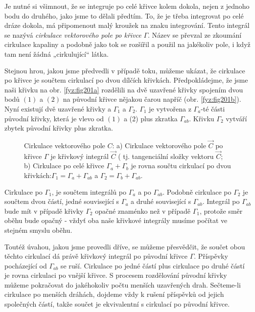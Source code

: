     Je nutné si všimnout, že se integruje po celé křivce kolem dokola, nejen z jednoho bodu do 
    druhého, jako jsme to dělali předtím. To, že je třeba integrovat po celé dráze dokola, má 
    připomenout malý kroužek na znaku integrování. Tento integrál se nazývá \emph{cirkulace 
    vektorového pole po křivce} \(\Gamma\). Název se převzal ze zkoumání cirkulace kapaliny a 
    podobně jako tok se rozšířil a použil na jakékoliv pole, i když tam není žádná „cirkulující“ 
    látka.
    
    Stejnou hrou, jakou jsme předvedli v případě toku, můžeme ukázat, že cirkulace po křivce je 
    součtem cirkulací po dvou dílčích křivkách. Předpokládejme, že jsme naši křivku na obr. 
    \ref{fyz:fig201a} rozdělili na dvě uzavřené křivky spojením dvou bodů \((1)\) a \((2)\) na 
    původní křivce nějakou čarou napříč (obr. \ref{fyz:fig201b}). Nyní existují dvě uzavřené 
    křivky  a \(\Gamma_1\) a \(\Gamma_2\). \(\Gamma_1\) je vytvořena z \(\Gamma_a\)-té části 
    původní křivky, která je vlevo od \((1)\) a (2) plus zkratka \(\Gamma_{ab}\). Křivku 
    \(\Gamma_2\) vytváří zbytek původní křivky plus zkratka.
    
    \begin{figure}[ht!]
      \centering
      \caption{Cirkulace vektorového pole \(C\): a) Cirkulace vektorového pole \(\vec{C}\) po 
               křivce \(\Gamma\) je křivkový integrál \(\vec{C}\) ( tj. tangenciální složky vektoru 
               \(\vec{C}\); b) Cirkulace po celé křivce \(\Gamma_a+\Gamma_b\) je rovna součtu 
               cirkulací po dvou křivkách:\(\Gamma_1=\Gamma_a+\Gamma_{ab}\) a \(\Gamma_2=\Gamma_b
               +\Gamma_{ab}\).}
      \label{fyz:fig201}
    \end{figure} 
 
    Cirkulace po \(\Gamma_1\), je součtem integrálů po \(\Gamma_a\) a po \(\Gamma_{ab}\). Podobně 
    cirkulace po \(\Gamma_2\) je součtem dvou částí, jedné související s \(\Gamma_a\) a druhé 
    související s \(\Gamma_{ab}\). Integrál po \(\Gamma_{ab}\) bude mít v případě křivky 
    \(\Gamma_2\) opačné znaménko než v případě \(\Gamma_1\), protože směr oběhu bude opačný - vždyť 
    oba naše křivkové integrály musíme počítat ve stejném smyslu oběhu.
        
    Toutéž úvahou, jakou jsme provedli dříve, se můžeme přesvědčit, že součet obou těchto cirkulací
    dá právě křivkový integrál po původní křivce \(\Gamma\). Příspěvky pocházející od 
    \(\Gamma_{ab}\) se ruší. Cirkulace po jedné částí plus cirkulace po druhé částí je rovna 
    cirkulaci po vnější křivce. S procesem rozdělování původní křivky můžeme pokračovat do 
    jakéhokoliv počtu menších uzavřených drah. Sečteme-li cirkulace po menších dráhách, dojdeme 
    vždy k rušení příspěvků od jejich společných částí, takže součet je ekvivalentní s cirkulací po 
    původní křivce.       

